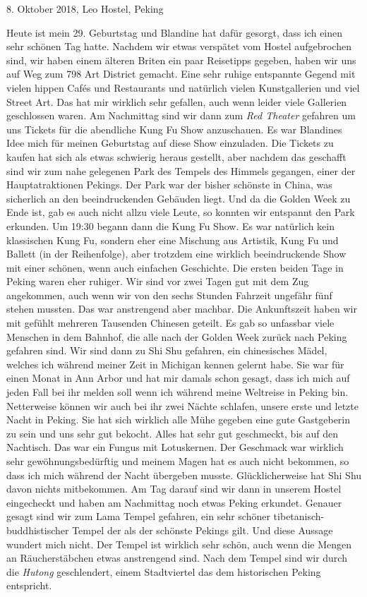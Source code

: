 \documentclass[11pt]{book}
\begin{document}
8. Oktober 2018, Leo Hostel, Peking

Heute ist mein 29. Geburtstag und Blandine hat dafür gesorgt, dass ich einen sehr schönen Tag hatte. Nachdem wir etwas 
verspätet vom Hostel aufgebrochen sind, wir haben einem älteren Briten ein paar Reisetipps gegeben, haben wir uns auf 
Weg zum 798 Art District gemacht. Eine sehr ruhige entspannte Gegend mit vielen hippen Cafés und Restaurants und 
natürlich vielen Kunstgallerien und viel Street Art. Das hat mir wirklich sehr gefallen, auch wenn leider viele 
Gallerien geschlossen waren. Am Nachmittag sind wir dann zum \emph{Red Theater} gefahren um uns Tickets für die 
abendliche Kung Fu Show anzuschauen. Es war Blandines Idee mich für meinen Geburtstag auf diese Show einzuladen.
Die Tickets zu kaufen hat sich als etwas schwierig heraus gestellt, aber nachdem das geschafft sind wir zum nahe 
gelegenen Park des Tempels des Himmels gegangen, einer der Hauptatraktionen Pekings. Der Park war der bisher schönste 
in China, was sicherlich an den beeindruckenden Gebäuden liegt. Und da die Golden Week zu Ende ist, gab es auch nicht 
allzu viele Leute, so konnten wir entspannt den Park erkunden. Um 19:30 begann dann die Kung Fu Show. Es war natürlich 
kein klassischen Kung Fu, sondern eher eine Mischung aus Artistik, Kung Fu und Ballett (in der Reihenfolge), aber 
trotzdem eine wirklich beeindruckende Show mit einer schönen, wenn auch einfachen Geschichte. 
Die ersten beiden Tage in Peking waren eher ruhiger. Wir sind vor zwei Tagen gut mit dem Zug angekommen, auch wenn 
wir von den sechs Stunden Fahrzeit ungefähr fünf stehen mussten. Das war anstrengend aber machbar. Die Ankunftszeit 
haben wir mit gefühlt mehreren Tausenden Chinesen geteilt. Es gab so unfassbar viele Menschen in dem Bahnhof, die alle 
nach der Golden Week zurück nach Peking gefahren sind. Wir sind dann zu Shi Shu gefahren, ein chinesisches Mädel, 
welches ich während meiner Zeit in Michigan kennen gelernt habe. Sie war für einen Monat in Ann Arbor und hat mir 
damals schon gesagt, dass ich mich auf jeden Fall bei ihr melden soll wenn ich während meine Weltreise in Peking bin.
Netterweise können wir auch bei ihr zwei Nächte schlafen, unsere erste und letzte Nacht in Peking. Sie hat sich 
wirklich alle Mühe gegeben eine gute Gastgeberin zu sein und uns sehr gut bekocht. Alles hat sehr gut geschmeckt, 
bis auf den Nachtisch. Das war ein Fungus mit Lotuskernen. Der Geschmack war wirklich sehr gewöhnungsbedürftig 
und meinem Magen hat es auch nicht bekommen, so dass ich mich während der Nacht übergeben musste. Glücklicherweise 
hat Shi Shu davon nichts mitbekommen. 
Am Tag darauf sind wir dann in unserem Hostel eingecheckt und haben am Nachmittag noch etwas Peking erkundet. 
Genauer gesagt sind wir zum Lama Tempel gefahren, ein sehr schöner tibetanisch-buddhistischer Tempel der als der 
schönste Pekings gilt. Und diese Aussage wundert mich nicht. Der Tempel ist wirklich sehr schön, auch wenn die 
Mengen an Räucherstäbchen etwas anstrengend sind. Nach dem Tempel sind wir durch die \emph{Hutong} geschlendert, 
einem Stadtviertel das dem historischen Peking entspricht. 
\end{document}
